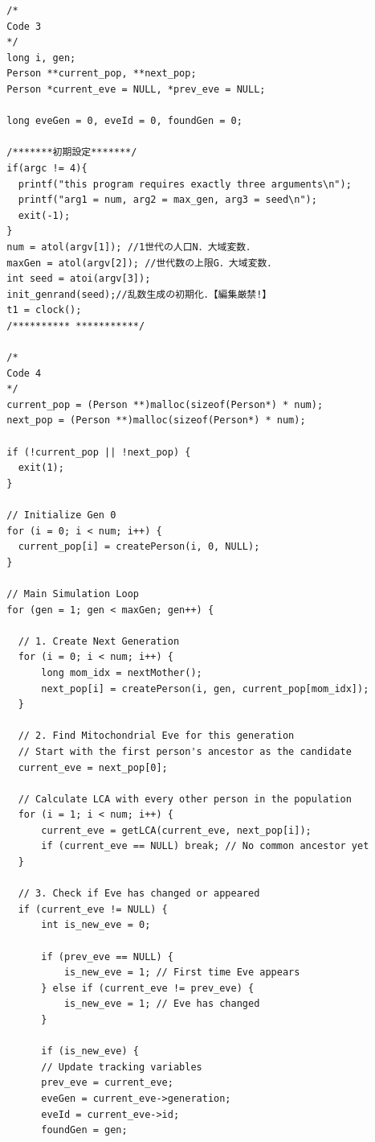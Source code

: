 \documentclass[a4paper,11pt]{jsarticle}
\begin{document}
\begin{small}
\begin{verbatim}
  /*
  Code 3
  */
  long i, gen;
  Person **current_pop, **next_pop;
  Person *current_eve = NULL, *prev_eve = NULL;

  long eveGen = 0, eveId = 0, foundGen = 0;

  /*******初期設定*******/
  if(argc != 4){
    printf("this program requires exactly three arguments\n");
    printf("arg1 = num, arg2 = max_gen, arg3 = seed\n");
    exit(-1);
  }
  num = atol(argv[1]); //1世代の人口N．大域変数．
  maxGen = atol(argv[2]); //世代数の上限G．大域変数．
  int seed = atoi(argv[3]);
  init_genrand(seed);//乱数生成の初期化．【編集厳禁!】
  t1 = clock();
  /********** ***********/

  /*
  Code 4
  */
  current_pop = (Person **)malloc(sizeof(Person*) * num);
  next_pop = (Person **)malloc(sizeof(Person*) * num);
  
  if (!current_pop || !next_pop) {
    exit(1);
  }

  // Initialize Gen 0
  for (i = 0; i < num; i++) {
    current_pop[i] = createPerson(i, 0, NULL);
  }

  // Main Simulation Loop
  for (gen = 1; gen < maxGen; gen++) {
      
    // 1. Create Next Generation
    for (i = 0; i < num; i++) {
        long mom_idx = nextMother();
        next_pop[i] = createPerson(i, gen, current_pop[mom_idx]);
    }

    // 2. Find Mitochondrial Eve for this generation
    // Start with the first person's ancestor as the candidate
    current_eve = next_pop[0]; 
      
    // Calculate LCA with every other person in the population
    for (i = 1; i < num; i++) {
        current_eve = getLCA(current_eve, next_pop[i]);
        if (current_eve == NULL) break; // No common ancestor yet
    }

    // 3. Check if Eve has changed or appeared
    if (current_eve != NULL) {
        int is_new_eve = 0;
        
        if (prev_eve == NULL) {
            is_new_eve = 1; // First time Eve appears
        } else if (current_eve != prev_eve) {
            is_new_eve = 1; // Eve has changed
        }

        if (is_new_eve) {
        // Update tracking variables
        prev_eve = current_eve;
        eveGen = current_eve->generation;
        eveId = current_eve->id;
        foundGen = gen;
             

\end{verbatim}
\end{small}
\end{document}
